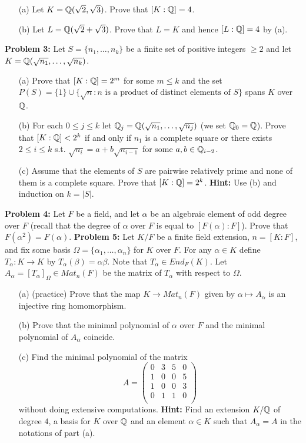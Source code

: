 \documentclass[12pt]{article}
\begin{document}
\begin{itemize}

\item[(a)] Let $K={\mathbb Q}(\sqrt{2},\sqrt{3})$. Prove that $[K:{\mathbb Q}]=4$.

\item[(b)] Let $L={\mathbb Q}(\sqrt{2}+\sqrt{3})$. Prove that $L=K$ and hence $[L:{\mathbb Q}]=4$ by (a).
\end{itemize}

{\bf Problem 3:} \rm Let $S=\{n_1,\ldots, n_k\}$ be a finite set of positive integers $\geq 2$
and let $K={\mathbb Q}(\sqrt{n_1},\ldots, \sqrt{n_k})$.
\begin{itemize}
\item[(a)] Prove that $[K:{\mathbb Q}]=2^m$ for some $m\leq k$ and the set $P(S)=\{1\}\cup \{\sqrt{n} : n \mbox{ is a product of distinct elements of }S\}$ spans $K$ over ${\mathbb Q}$.

\item[(b)] For each $0\leq j\leq k$ let ${\mathbb Q}_j={\mathbb Q}(\sqrt{n_1},\ldots, \sqrt{n_j})$ (we set ${\mathbb Q}_0={\mathbb Q}$).
Prove that $[K:{\mathbb Q}]<2^k$ if and only if $n_1$ is a complete square or
there exists $2\leq i\leq k$ s.t. $\sqrt{n_i}=a+b\sqrt{n_{i-1}}$ for some $a,b\in{\mathbb Q}_{i-2}$.

\item[(c)] Assume that the elements of $S$ are pairwise relatively prime
and none of them is a complete square.
Prove that $[K:{\mathbb Q}]=2^k$. {\bf Hint:} Use (b) and induction on $k=|S|$.
\end{itemize}

{\bf Problem 4:} \rm Let $F$ be a field, and let $\alpha$ be an algebraic element of odd degree
over $F$ (recall that the degree of $\alpha$ over $F$ is equal to $[F(\alpha):F]$). Prove that
$F(\alpha^2)=F(\alpha)$.
\skv
\skv
{\bf Problem 5:} Let $K/F$ be a finite field extension, $n=[K:F]$, and fix some basis
$\Omega=\{\alpha_1,\ldots, \alpha_n\}$
for $K$ over $F$. For any $\alpha\in K$
define $T_{\alpha}:K\to K$ by $T_{\alpha}(\beta)=\alpha\beta$. Note that $T_{\alpha}\in  End_F(K)$.
Let $A_{\alpha}=[T_{\alpha}]_{\Omega}\in Mat_n(F)$ be the matrix of $T_{\alpha}$ with respect to $\Omega$.
\begin{itemize}


\item[(a)] (practice) Prove that the map $K\to Mat_n(F)$ given by $\alpha\mapsto A_{\alpha}$ is an injective ring homomorphism.
\item[(b)] Prove that the minimal polynomial of $\alpha$ over $F$ and the minimal polynomial of $A_{\alpha}$
coincide.

\item[(c)] Find the minimal polynomial of the matrix
$$A=\begin{pmatrix}  0&3& 5&0\\
1&0& 0&5\\
1&0& 0&3\\
0&1& 1&0\\
\end{pmatrix}$$
without doing extensive computations.
{\bf Hint:} Find an extension $K/{\mathbb Q}$ of degree $4$, a basis for $K$ over ${\mathbb Q}$
and an element $\alpha\in K$ such that $A_{\alpha}=A$ in the notations of part (a).
\end{itemize}
\end{document}
